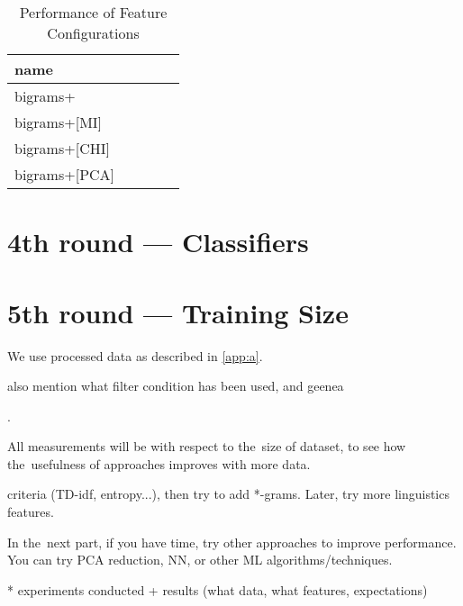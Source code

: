 \begin{table}[h!]

\centering
\begin{tabular}{lllll}
\toprule
\textbf{name}\\	%
\midrule
bigrams+ \\
bigrams+[MI] \\
bigrams+[CHI] \\
bigrams+[PCA] \\
\bottomrule
\end{tabular}

\caption{Performance of Feature Configurations}\label{tab:feat_perf}
\end{table}

\section{4th round --- Classifiers}

\section{5th round --- Training Size}

We use processed data as described in \autoref{app:a}.

also mention what filter condition has been used, and geenea


\label{chap:exp}

.

All measurements will be with respect to the~size of dataset, to see how the~usefulness of approaches improves with more data.

criteria (TD-idf, entropy...), then try to add *-grams. Later, try more linguistics features.

In the~next part, if you have time, try other approaches to improve performance. You can try PCA reduction, NN, or other ML algorithms/techniques.

* experiments conducted + results (what data, what features, expectations)


